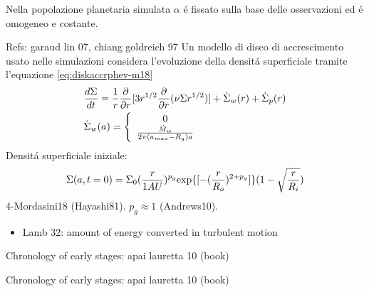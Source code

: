 \begin{workout}
	Nella popolazione planetaria simulata $\alpha$ \'e fissato sulla base delle osservazioni  ed \'e omogeneo e costante.
\end{workout}

\begin{workout}
	Refs: garaud lin 07, chiang goldreich 97
	Un modello di disco  di accrescimento usato nelle simulazioni considera l'evoluzione della densit\'a superficiale tramite l'equazione \eqref{eq:diskaccrphev-m18}
	\begin{align}
		&\frac{d \Sigma}{d t}=\frac{1}{r}\frac{\partial}{\partial r}[3r^{1/2}\frac{\partial}{\partial r}(\nu\Sigma r^{1/2})]+\dot{\Sigma}_w(r)+\dot{\Sigma}_p(r)\label{eq:diskaccrphev-m18}\\
		&\dot{\Sigma}_w(a)=\left\{\begin{array}{c}0\\\frac{\dot{M}_w}{2\pi(a_{max}-R_g)a}\\\end{array}\right.
	\end{align}
	Densit\'a superficiale iniziale:
	\begin{equation}
	\Sigma(a,t=0)=\Sigma_0(\frac{r}{1AU})^{p_g}\text{exp}\{[-(\frac{r}{R_o})^{2+p_g}]\}(1-\sqrt{\frac{r}{R_i}})
	\end{equation}
	4-Mordasini18 (Hayashi81). $p_g\approx1$ (Andrews10).
\end{workout}

\begin{workout}
	\begin{itemize}
		\item Lamb 32: amount of energy converted in turbulent motion
	\end{itemize}
\end{workout}

\begin{workout}
	Chronology of  early stages: apai lauretta 10 (book)
\end{workout}

\begin{workout}
	Chronology of  early stages: apai lauretta 10 (book)
\end{workout}
